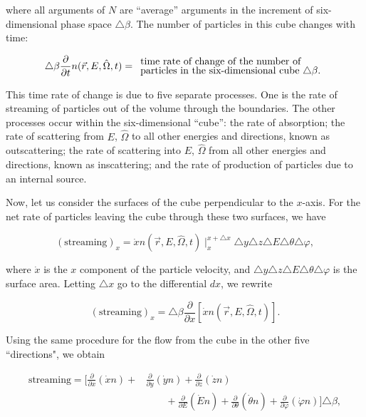 \documentclass[12pt]{article}
\newcommand{\rvec}{\ensuremath{\vec{r}}}
\newcommand{\omvec}{\ensuremath{\hat{\Omega}}}
\begin{document}
where all arguments of $N$ are ``average'' arguments in the increment of
six-dimensional phase space $\triangle \beta$. The number of particles in this
cube changes with time:

\begin{equation*}
\triangle \beta\frac{\partial}{\partial t}n(\rvec,E,\omvec,t) =
\begin{array}{l}
\text{time rate of change of the number of}\vspace{-0.1cm}\\
\text{particles in the six-dimensional cube $\triangle \beta$.}
\end{array}
\end{equation*}

This time rate of change is due to five separate processes. One is the rate of
streaming of particles out of the volume through the boundaries. The other
processes occur within the six-dimensional ``cube'': the rate of absorption;
the rate of scattering from $E$, $\omvec$ to all other energies and directions,
known as outscattering; the rate of scattering into $E$, $\omvec$ from all
other energies and directions, known as inscattering; and the rate of
production of particles due to an internal source.

Now, let us consider the surfaces of the cube perpendicular to the $x$-axis.
For the net rate of particles leaving the cube through these two surfaces, we
have

\begin{equation*}
(\textrm{streaming})_x = \dot x n(\rvec,E,\omvec,t)\mid_x^{x+\triangle x}
\triangle y\triangle z\triangle E\triangle \theta \triangle\varphi,
\end{equation*}

where $\dot x$ is the $x$ component of the particle velocity, and 
$\triangle y\triangle z\triangle E\triangle\theta\triangle \varphi$ is the
surface area. Letting $\triangle x$ go to the differential $dx$, we rewrite

\begin{equation*}
(\textrm{streaming})_x = \triangle\beta \frac{\partial}{\partial x}
\left[\dot x n(\rvec,E,\omvec,t)\right].
\end{equation*}

Using the same procedure for the flow from the cube in the other five
``directions", we obtain

\begin{align*}
\textrm{streaming} =
\bigg[ \frac{\partial}{\partial x}(\dot x n) + &
\frac{\partial}{\partial y}(\dot y n) +\frac{\partial}{\partial z}(\dot z n) \\
&\quad\quad + \frac{\partial}{\partial E}(\dot E n) + 
\frac{\partial}{\partial \theta}(\dot \theta n) +
\frac{\partial}{\partial \varphi}(\dot \varphi n)\bigg] \triangle \beta,
\end{align*}
\end{document}
